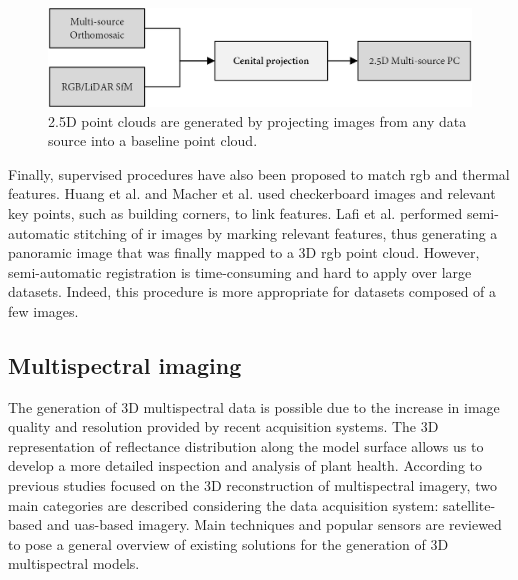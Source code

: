 \begin{figure}[ht]
	\includegraphics[width=\linewidth]{figs/context/fusion_02.png}
	\caption{2.5D point clouds are generated by projecting images from any data source into a baseline point cloud.}
    \label{fig:fusion_data_02}
\end{figure}

Finally, supervised procedures have also been proposed to match \acrshort{rgb} and thermal features. Huang et al. and Macher et al. \cite{huang_combining_2018, macher_combination_2019} used checkerboard images and relevant key points, such as building corners, to link features. Lafi et al. \cite{lafi_3d_2017} performed semi-automatic stitching of \acrshort{ir} images by marking relevant features, thus generating a panoramic image that was finally mapped to a 3D \acrshort{rgb} point cloud. However, semi-automatic registration is time-consuming and hard to apply over large datasets. Indeed, this procedure is more appropriate for datasets composed of a few images.

\subsection{Multispectral imaging}

The generation of 3D multispectral data is possible due to the increase in image quality and resolution provided by recent acquisition systems. The 3D representation of reflectance distribution along the model surface allows us to develop a more detailed inspection and analysis of plant health. According to previous studies focused on the 3D reconstruction of multispectral imagery, two main categories are described considering the data acquisition system: satellite-based and \acrshort{uas}-based imagery. Main techniques and popular sensors are reviewed to pose a general overview of existing solutions for the generation of 3D multispectral models.


